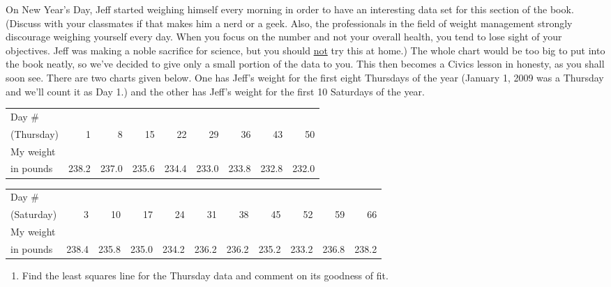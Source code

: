 \documentclass{ximera}
\begin{document}
\begin{problem}
On New Year's Day, Jeff started weighing himself every morning in order to have an interesting data set for this section of the book.  (Discuss with your classmates if that makes him a nerd or a geek.  Also, the professionals in the field of weight management strongly discourage weighing yourself every day.  When you focus on the number and not your overall health, you tend to lose sight of your objectives. Jeff was making a noble sacrifice for science, but you should \underline{not} try this at home.)  The whole chart would be too big to put into the book neatly, so we've decided to give only a small portion of the data to you.  This then becomes a Civics lesson in honesty, as you shall soon see.  There are two charts given below.  One has Jeff's weight for the first eight Thursdays of the year (January 1, 2009 was a Thursday and we'll count it as Day 1.) and the other has Jeff's weight for the first 10 Saturdays of the year.  

\medskip

\small

\noindent \begin{tabular}{|l|r|r|r|r|r|r|r|r|} \hline
Day \# & & & & & & & &  \\
(Thursday) & 1 & 8 & 15 & 22 & 29 & 36 & 43 & 50 \\ 
\hline 
My weight & & & & & & & & \\
in pounds & 238.2 & 237.0 & 235.6 & 234.4 & 233.0 & 233.8 & 232.8 & 232.0\\ \hline
\end{tabular}

\medskip

\noindent \begin{tabular}{|l|r|r|r|r|r|r|r|r|r|r|} \hline
Day \# & & & & & & & & & & \\
(Saturday) & 3 & 10 & 17 & 24 & 31 & 38 & 45 & 52 & 59 & 66 \\ 
\hline 
My weight & & & & & & & & & & \\
in pounds & 238.4 & 235.8 & 235.0 & 234.2 & 236.2 & 236.2 & 235.2 & 233.2 & 236.8 & 238.2\\ \hline
\end{tabular}

\normalsize

\medskip

\begin{enumerate}

\item Find the least squares line for the Thursday data and comment on its goodness of fit.


\end{enumerate}
\end{problem}
\end{document}
